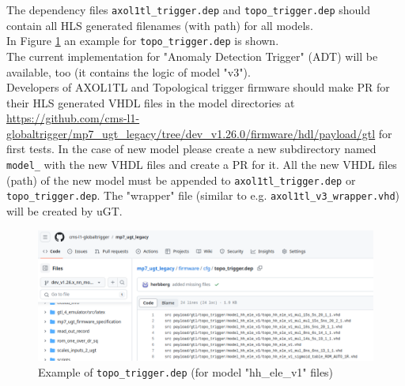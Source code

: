 The dependency files \texttt{axol1tl\_trigger.dep} and \texttt{topo\_trigger.dep} should contain all HLS generated filenames (with path) for all models.\\
In Figure \ref{fig:topo_dep} an example for \texttt{topo\_trigger.dep} is shown.\\

The current implementation for "Anomaly Detection Trigger" (ADT) will be available, too (it contains the logic of model "v3").\\

Developers of AXOL1TL and Topological trigger firmware should make PR for their HLS generated VHDL files in the model directories at \url{https://github.com/cms-l1-globaltrigger/mp7_ugt_legacy/tree/dev_v1.26.0/firmware/hdl/payload/gtl} for first tests. In the case of new model please create a new subdirectory named \texttt{model\_<new model name>} with the new VHDL files and create a PR for it. All the new VHDL files (path) of the new model must be appended to \texttt{axol1tl\_trigger.dep} or \texttt{topo\_trigger.dep}. The "wrapper" file (similar to e.g. \texttt{axol1tl\_v3\_wrapper.vhd}) will be created by uGT.\\

\begin{figure}[htb]
\centering
\includegraphics[width=15cm]{figures/topo_dep}
\caption{Example of \texttt{topo\_trigger.dep} (for model "hh\_ele\_v1" files)}
\label{fig:topo_dep}
\end{figure}
